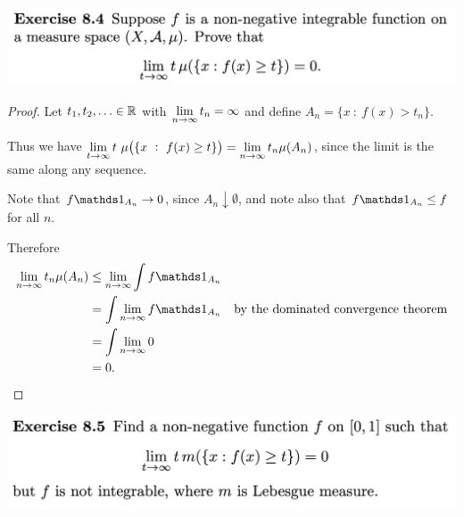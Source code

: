 


\begin{mdframed}
\includegraphics[width=400pt]{img/analysis--berkeley-202a-hw09-210c.png}
\end{mdframed}

\begin{proof}
  Let $t_1, t_2, \ldots \in \mathbb{R}$ with $\limn t_n = \infty$ and define $A_n = \{x ~:~ f(x) > t_n\}$.

  Thus we have $\lim_{t\to\infty} t ~ \mu\big(\{x ~:~ f(x) \geq t\}\big) = \limn t_n \mu(A_n)$, since the limit
  is the same along any sequence.

  Note that $f\ind_{A_n} \to 0$, since $A_n \downarrow \emptyset$, and note also that $f\ind_{A_n} \leq f$ for
  all $n$.

  Therefore
  \begin{align*}
    \limn t_n \mu(A_n)
    &\leq \limn \int f\ind_{A_n} \\
    &= \int \limn f\ind_{A_n}             &\text{by the dominated convergence theorem}\\
    &= \int \limn 0 \\
    &= 0.
  \end{align*}
\end{proof}

\newpage
\begin{mdframed}
\includegraphics[width=400pt]{img/analysis--berkeley-202a-hw09-b0e8.png}
\end{mdframed}

